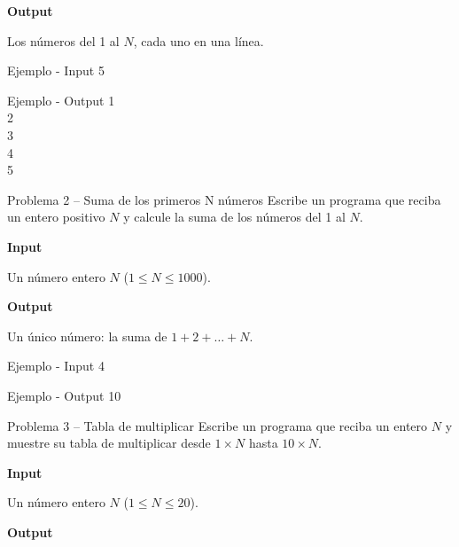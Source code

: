 \documentclass{article}
\begin{document}
\vspace{0.5em}
\textbf{Output}

Los números del 1 al $N$, cada uno en una línea.

\vspace{0.5em}

\begin{container}{Ejemplo - Input}
5
\end{container}

\begin{container}{Ejemplo - Output}
1\\
2\\
3\\
4\\
5
\end{container}

\vspace{3.5em}


\begin{container}{Problema 2 – Suma de los primeros N números}
Escribe un programa que reciba un entero positivo $N$ y calcule la suma de los números del 1 al $N$.
\end{container}

\textbf{Input}

Un número entero $N$ ($1 \leq N \leq 1000$).

\vspace{0.5em}
\textbf{Output}

Un único número: la suma de $1 + 2 + \dots + N$.

\vspace{0.5em}

\begin{container}{Ejemplo - Input}
4
\end{container}

\begin{container}{Ejemplo - Output}
10
\end{container}

\vspace{3.5em}


\begin{container}{Problema 3 – Tabla de multiplicar}
Escribe un programa que reciba un entero $N$ y muestre su tabla de multiplicar desde $1 \times N$ hasta $10 \times N$.
\end{container}

\textbf{Input}

Un número entero $N$ ($1 \leq N \leq 20$).

\vspace{0.5em}
\textbf{Output}
\end{document}

